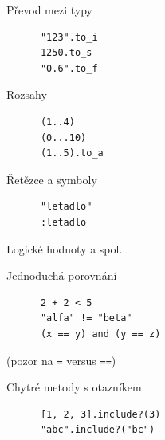 \documentclass{beamer}
\begin{document}
\begin{frame}[fragile]{}
  \begin{block}{Převod mezi typy}
    \begin{verbatim}
      "123".to_i
      1250.to_s
      "0.6".to_f
    \end{verbatim}
  \end{block}
  \pause
\end{frame}

\begin{frame}[fragile]{}
  \begin{block}{Rozsahy}
    \begin{verbatim}
      (1..4)
      (0...10)
      (1..5).to_a
    \end{verbatim}
  \end{block}
  \pause
  \begin{block}{Řetězce a symboly}
    \begin{verbatim}
      "letadlo"
      :letadlo
    \end{verbatim}
  \end{block}
\end{frame}

\begin{frame}[fragile]{Logické hodnoty a spol.}
  \begin{block}{Jednoduchá porovnání}
    \begin{verbatim}
      2 + 2 < 5
      "alfa" != "beta"
      (x == y) and (y == z)
    \end{verbatim}
  \end{block}
  (pozor na \texttt{=} versus \texttt{==})
  \pause
  \begin{block}{Chytré metody s otazníkem}
    \begin{verbatim}
      [1, 2, 3].include?(3)
      "abc".include?("bc")
    \end{verbatim}
  \end{block}
\end{frame}
\end{document}
